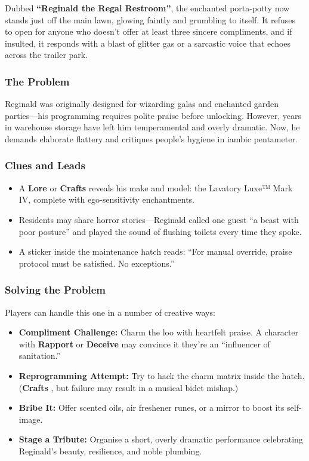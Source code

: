 Dubbed \textbf{“Reginald the Regal Restroom”}, the enchanted porta-potty now stands just off the main lawn, glowing faintly and grumbling to itself. It refuses to open for anyone who doesn’t offer at least three sincere compliments, and if insulted, it responds with a blast of glitter gas or a sarcastic voice that echoes across the trailer park.

\subsubsection{The Problem}
Reginald was originally designed for wizarding galas and enchanted garden parties—his programming requires polite praise before unlocking. However, years in warehouse storage have left him temperamental and overly dramatic. Now, he demands elaborate flattery and critiques people’s hygiene in iambic pentameter.

\subsubsection{Clues and Leads}
\begin{itemize}
    \item A \textbf{Lore} or \textbf{Crafts}  reveals his make and model: the Lavatory Luxe™ Mark IV, complete with ego-sensitivity enchantments.
    \item Residents may share horror stories—Reginald called one guest “a beast with poor posture” and played the sound of flushing toilets every time they spoke.
    \item A sticker inside the maintenance hatch reads: “For manual override, praise protocol must be satisfied. No exceptions.”
\end{itemize}

\subsubsection{Solving the Problem}
Players can handle this one in a number of creative ways:
\begin{itemize}
    \item \textbf{Compliment Challenge:} Charm the loo with heartfelt praise. A character with \textbf{Rapport} or \textbf{Deceive} may convince it they’re an “influencer of sanitation.”
    \item \textbf{Reprogramming Attempt:} Try to hack the charm matrix inside the hatch. (\textbf{Crafts} , but failure may result in a musical bidet mishap.)
    \item \textbf{Bribe It:} Offer scented oils, air freshener runes, or a mirror to boost its self-image.
    \item \textbf{Stage a Tribute:} Organise a short, overly dramatic performance celebrating Reginald’s beauty, resilience, and noble plumbing.
\end{itemize}

